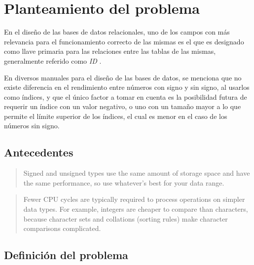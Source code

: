 \section{Planteamiento del problema}


En el diseño de las bases de datos relacionales, uno de los campos con más relevancia para el funcionamiento correcto de las mismas es el que es designado como llave primaria para las relaciones entre las tablas de las mismas, generalmente referido como \textit{ID} \cite{Schwartz_2012}.

En diversos manuales para el diseño de las bases de datos, se menciona que no existe diferencia en el rendimiento entre números con signo y sin signo, al usarlos como índices, y que el único factor a tomar en cuenta es la posibilidad futura de requerir un índice con un valor negativo, o uno con un tamaño mayor a lo que permite el límite superior de los índices, el cual es menor en el caso de los números sin signo.


\subsection{Antecedentes}



\begin{quote}
   Signed and unsigned types use the same amount of storage space and have the same performance, so use whatever’s best for your data range.
   \cite{Schwartz_2012}
\end{quote}

\begin{quote}
   Fewer CPU cycles are typically required to process operations on simpler data types. For example, integers are cheaper to compare than characters, because character sets and collations (sorting rules) make character comparisons complicated.
   \cite{Schwartz_2012}
\end{quote}
\subsection{Definición del problema}
